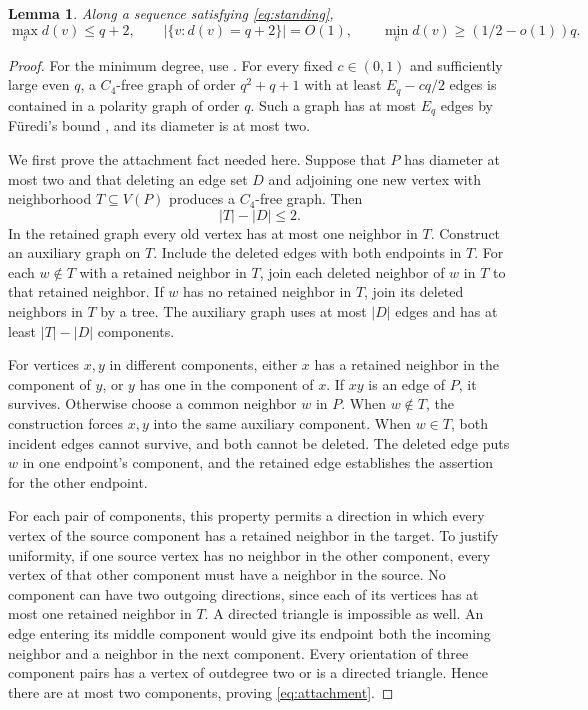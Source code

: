 \documentclass[11pt,reqno]{amsart}
\newtheorem{lemma}[theorem]{Lemma}
\theoremstyle{definition}
\theoremstyle{remark}
\numberwithin{equation}{section}
\begin{document}
\begin{lemma}\label{lem:degrees}
Along a sequence satisfying \eqref{eq:standing},
\begin{equation}\label{eq:degrees}
 \max_v d(v)\le q+2,\qquad
 |\{v:d(v)=q+2\}|=O(1),\qquad
 \min_v d(v)\ge(1/2-o(1))q.
\end{equation}
\end{lemma}
\begin{proof}
For the minimum degree, use \cite[Theorem~3.1]{hmy2023}. For every
fixed $c\in(0,1)$ and sufficiently large even $q$, a $C_4$-free graph
of order $q^2+q+1$ with at least $E_q-cq/2$ edges is contained in a
polarity graph of order $q$. Such a graph has at most $E_q$ edges by
F\"uredi's bound \cite{furedi}, and its diameter is at most two.

We first prove the attachment fact needed here. Suppose that $P$ has
diameter at most two and that deleting an edge set $D$ and adjoining
one new vertex with neighborhood $T\subseteq V(P)$ produces a
$C_4$-free graph. Then
\begin{equation}\label{eq:attachment}
 |T|-|D|\le2.
\end{equation}
In the retained graph every old vertex has at most one neighbor in
$T$. Construct an auxiliary graph on $T$. Include the deleted edges
with both endpoints in $T$. For each $w\notin T$ with a retained
neighbor in $T$, join each deleted neighbor of $w$ in $T$ to that
retained neighbor. If $w$ has no retained neighbor in $T$, join its
deleted neighbors in $T$ by a tree. The auxiliary graph uses at most
$|D|$ edges and has at least $|T|-|D|$ components.

For vertices $x,y$ in different components, either $x$ has a retained
neighbor in the component of $y$, or $y$ has one in the component of
$x$. If $xy$ is an edge of $P$, it survives. Otherwise choose a common
neighbor $w$ in $P$. When $w\notin T$, the construction forces $x,y$
into the same auxiliary component. When $w\in T$, both incident
edges cannot survive, and both cannot be deleted. The deleted edge
puts $w$ in one endpoint's component, and the retained edge establishes
the assertion for the other endpoint.

For each pair of components, this property permits a direction in
which every vertex of the source component has a retained neighbor
in the target. To justify uniformity, if one source vertex has no
neighbor in the other component, every vertex of that other component
must have a neighbor in the source. No component can have two outgoing
directions, since each of its vertices has at most one retained neighbor
in $T$. A directed triangle is impossible as well. An edge entering
its middle component would give its endpoint both the incoming
neighbor and a neighbor in the next component. Every orientation of
three component pairs has a vertex of outdegree two or is a directed
triangle. Hence there are at most two components, proving
\eqref{eq:attachment}.


\end{proof}
\end{document}

